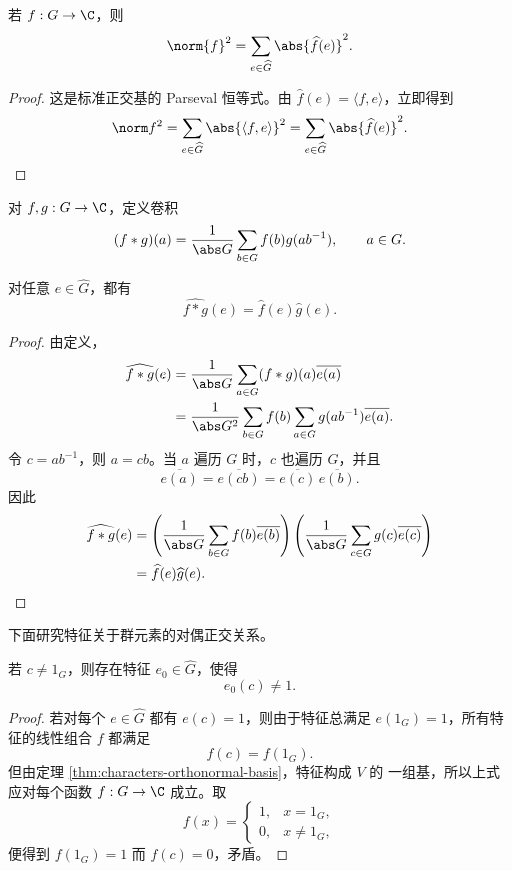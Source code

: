 \begin{theorem}
	\label{thm:finite-abelian-parseval}
	若 $f:G\to\C$，则
	\[
	\norm{f}^2=\sum_{e\in\widehat G}\abs{\widehat f(e)}^2.
	\]
\end{theorem}

\begin{proof}
	这是标准正交基的 Parseval 恒等式。由
	$\widehat f(e)=\langle f,e\rangle$，立即得到
	\[
	\norm f^2
	=\sum_{e\in\widehat G}\abs{\langle f,e\rangle}^2
	=\sum_{e\in\widehat G}\abs{\widehat f(e)}^2.
	\]
\end{proof}

\begin{definition}
	对 $f,g:G\to\C$，定义卷积
\[
(f*g)(a)=\frac1{\abs G}\sum_{b\in G}f(b)g(ab^{-1}),
\qquad a\in G.
\]
\end{definition}

\begin{proposition}
	\label{prop:finite-abelian-convolution-theorem}
	对任意 $e\in\widehat G$，都有
	\[
	\widehat{f*g}(e)=\widehat f(e)\widehat g(e).
	\]
\end{proposition}

\begin{proof}
	由定义，
	\[
	\begin{aligned}
	\widehat{f*g}(e)
	&=\frac1{\abs G}\sum_{a\in G}(f*g)(a)\overline{e(a)}\\
	&=\frac1{\abs G^2}\sum_{b\in G}f(b)
	\sum_{a\in G}g(ab^{-1})\overline{e(a)}.
	\end{aligned}
	\]
	令 $c=ab^{-1}$，则 $a=cb$。当 $a$ 遍历 $G$ 时，$c$ 也遍历
	$G$，并且
	\[
	\overline{e(a)}=\overline{e(cb)}
	=\overline{e(c)}\,\overline{e(b)}.
	\]
	因此
	\[
	\begin{aligned}
	\widehat{f*g}(e)
	&=\left(\frac1{\abs G}\sum_{b\in G}
	f(b)\overline{e(b)}\right)
	\left(\frac1{\abs G}\sum_{c\in G}
	g(c)\overline{e(c)}\right)\\
	&=\widehat f(e)\widehat g(e).
	\end{aligned}
	\]
\end{proof}

下面研究特征关于群元素的对偶正交关系。

\begin{lemma}[特征分离点]\label{lem:characters-separate-points}
	若 $c\neq1_G$，则存在特征 $e_0\in\widehat G$，使得
	\[
	e_0(c)\neq1.
	\]
\end{lemma}

\begin{proof}
	若对每个 $e\in\widehat G$ 都有 $e(c)=1$，则由于特征总满足
	$e(1_G)=1$，所有特征的线性组合 $f$ 都满足
	\[
	f(c)=f(1_G).
	\]
	但由定理 \ref{thm:characters-orthonormal-basis}，特征构成 $V$ 的
	一组基，所以上式应对每个函数 $f:G\to\C$ 成立。取
	\[
	f(x)=
	\begin{cases}
	1,&x=1_G,\\
	0,&x\neq1_G,
	\end{cases}
	\]
	便得到 $f(1_G)=1$ 而 $f(c)=0$，矛盾。
\end{proof}

